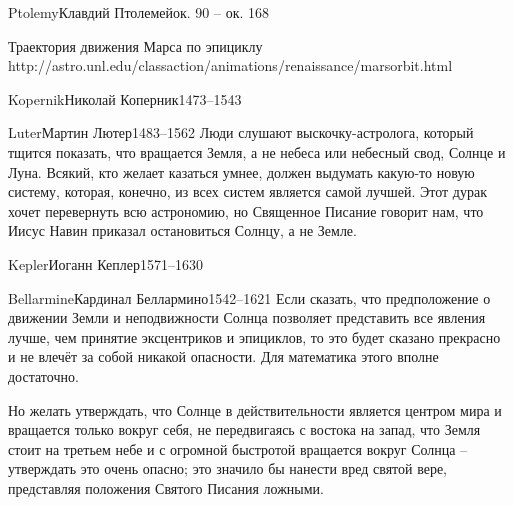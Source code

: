 \documentclass[aspectratio=169]{beamer}
\begin{document}
\begin{Person}{Ptolemy}{Клавдий Птолемей}{ок. 90 -- ок. 168}
\end{Person}

{Траектория движения Марса по эпициклу\\http://astro.unl.edu/classaction/animations/renaissance/marsorbit.html}

\begin{Person}{Kopernik}{Николай Коперник}{1473--1543}
\end{Person}

\begin{Person}{Luter}{Мартин Лютер}{1483--1562}
Люди слушают выскочку-астролога, который тщится показать, что вращается Земля, а не небеса
или небесный свод, Солнце и Луна. Всякий, кто желает казаться умнее, должен выдумать
какую-то новую систему, которая, конечно, из всех систем является самой лучшей. Этот
дурак хочет перевернуть всю астрономию, но Священное Писание говорит нам, что Иисус
Навин приказал остановиться Солнцу, а не Земле.
\end{Person}

\begin{Person}{Kepler}{Иоганн Кеплер}{1571--1630}
\end{Person}



\begin{Person}{Bellarmine}{Кардинал Беллармино}{1542--1621}
Если сказать, что предположение о движении Земли и неподвижности Солнца позволяет 
представить все явления лучше, чем принятие эксцентриков и эпициклов, 
то это будет сказано прекрасно и не влечёт за собой никакой опасности. Для математика 
этого вполне достаточно. 

Но желать утверждать, что Солнце в действительности является центром мира и
 вращается только вокруг себя, не передвигаясь с востока на запад, 
что Земля стоит на третьем небе и с огромной быстротой вращается вокруг Солнца --
 утверждать это очень опасно; это значило бы нанести вред святой вере,
 представляя положения Святого Писания ложными.
\end{Person}
\end{document}
